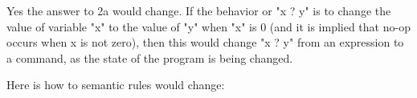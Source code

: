 \documentclass[11pt]{article}
\begin{document}
\begin{enumerate}
\begin{enumerate}
Yes the answer to 2a would change.  If the behavior or "x ? y" is to change the value of variable "x" to the value of "y" when "x" is 0 (and it is implied that no-op occurs when x is not zero), then this would change "x ? y" from an expression to a command, as the state of the program is being changed. \newline

Here is how to semantic rules would change:\newline \newline
{}
\newline
{}
\newline \newline \newline
{}
\newline
{}


\end{enumerate}

\end{enumerate}
\end{document}
